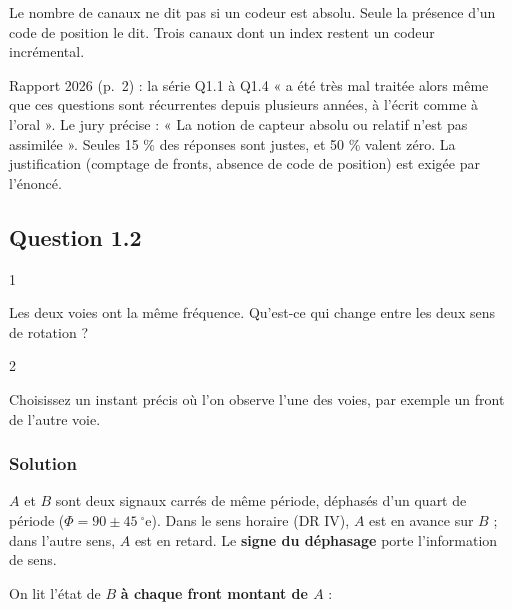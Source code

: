 \documentclass[11pt,a4paper]{article}
\begin{document}
\begin{piege}

Le nombre de canaux ne dit pas si un codeur est absolu. Seule la présence d'un code de position le dit. Trois canaux dont un index restent un codeur incrémental.

\end{piege}

\begin{jury}

Rapport 2026 (p.~2) : la série Q1.1 à Q1.4 « a été très mal traitée alors même que ces questions sont récurrentes depuis plusieurs années, à l'écrit comme à l'oral ». Le jury précise : « La notion de capteur absolu ou relatif n'est pas assimilée ». Seules 15 \% des réponses sont justes, et 50 \% valent zéro. La justification (comptage de fronts, absence de code de position) est exigée par l'énoncé.

\end{jury}

\hypertarget{question-1.2}{%
\subsection{Question 1.2}\label{question-1.2}}

\begin{indication}{1}

Les deux voies ont la même fréquence. Qu'est-ce qui change entre les deux sens de rotation ?

\end{indication}

\begin{indication}{2}

Choisissez un instant précis où l'on observe l'une des voies, par exemple un front de l'autre voie.

\end{indication}

\hypertarget{solution-1}{%
\subsubsection{Solution}\label{solution-1}}

\(A\) et \(B\) sont deux signaux carrés de même période, déphasés d'un quart de période (\(\Phi = 90 \pm 45\ ^\circ\text{e}\)). Dans le sens horaire (DR IV), \(A\) est en avance sur \(B\) ; dans l'autre sens, \(A\) est en retard. Le \textbf{signe du déphasage} porte l'information de sens.

On lit l'état de \(B\) \textbf{à chaque front montant de \(A\)} :
\end{document}
